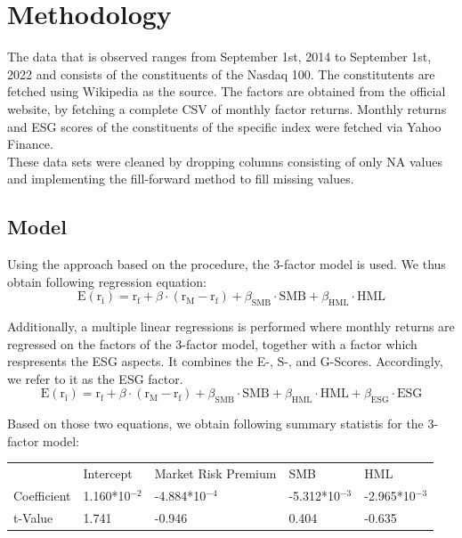 \documentclass[12pt, a4paper]{article}%
\begin{document}
\section{Methodology}
The data that is observed ranges from September 1st, 2014 to September 1st, 2022 and consists of the constituents of the Nasdaq 100. The constitutents are fetched using Wikipedia as the source.
The \textcite{FamaFrench1992} factors are obtained from the official website, by fetching a complete CSV of monthly factor returns.
Monthly returns and ESG scores of the constituents of the specific index were fetched via Yahoo Finance.\\

These data sets were cleaned by dropping columns consisting of only NA values and implementing the fill-forward method to fill missing values.

\subsection{Model}
Using the approach based on the \textcite{FamaFrench1992} procedure, the 3-factor model is used. We thus obtain following regression equation:\\
\begin{equation} \text{E}(\text{r}_{\text{i}}) = \text{r}_{\text{f}} + \beta \cdot (\text{r}_{\text{M}} - \text{r}_{\text{f}}) + \beta_{\text{SMB}} \cdot \text{SMB} + \beta_{\text{HML}} \cdot \text{HML} \end{equation}

Additionally, a multiple linear regressions is performed where monthly returns are regressed on the factors of the 3-factor model, together with a factor which respresents the ESG aspects. It combines the E-, S-, and G-Scores. Accordingly, we refer to it as the ESG factor.\\
\begin{equation} \text{E}(\text{r}_{\text{i}}) = \text{r}_{\text{f}} + \beta \cdot (\text{r}_{\text{M}} - \text{r}_{\text{f}}) + \beta_{\text{SMB}} \cdot \text{SMB} + \beta_{\text{HML}} \cdot \text{HML} + \beta_{\text{ESG}} \cdot \text{ESG} \end{equation}

Based on those two equations, we obtain following summary statistis for the 3-factor model:
\begin{table}[]
    \begin{tabular}{lllll}
                & Intercept                      & Market Risk Premium             & SMB                             & HML                             \\
    Coefficient & 1.160*10$^{-2}$ & -4.884*10$^{-4}$ & -5.312*10$^{-3}$ & -2.965*10$^{-3}$ \\
    t-Value     & 1.741                          & -0.946                          & 0.404                           & -0.635                         
    \end{tabular}
    \end{table}
\end{document}

